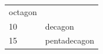{\begin{tabular}[t]{|l|l|}
        octagon%
     \tabularnewline\cline{1-1}\cline{2-2}
        10 &
        decagon%
     \tabularnewline\cline{1-1}\cline{2-2}
        15 &
        pentadecagon%
     \tabularnewline\cline{1-1}\cline{2-2}
    \end{tabular}} %
